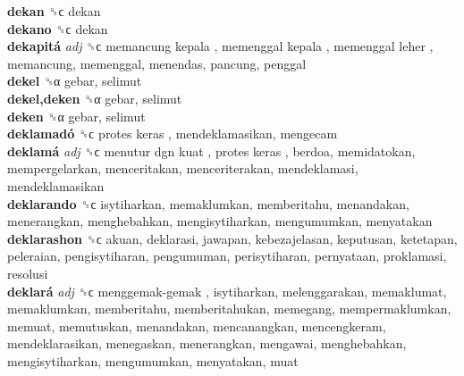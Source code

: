 \textbf{dekan} ␝ϲ  dekan  \\
\textbf{dekano} ␝ϲ  dekan  \\
\textbf{dekapitá} \emph{adj}  ␝ϲ   memancung kepala ,  memenggal kepala ,  memenggal leher , memancung, memenggal, menendas, pancung, penggal  \\
\textbf{dekel} ␝α  gebar, selimut  \\
\textbf{dekel,deken} ␝α  gebar, selimut  \\
\textbf{deken} ␝α  gebar, selimut  \\
\textbf{deklamadó} ␝ϲ   protes keras , mendeklamasikan, mengecam  \\
\textbf{deklamá} \emph{adj}  ␝ϲ   menutur dgn kuat ,  protes keras , berdoa, memidatokan, mempergelarkan, menceritakan, menceriterakan, mendeklamasi, mendeklamasikan  \\
\textbf{deklarando} ␝ϲ  isytiharkan, memaklumkan, memberitahu, menandakan, menerangkan, menghebahkan, mengisytiharkan, mengumumkan, menyatakan  \\
\textbf{deklarashon} ␝ϲ  akuan, deklarasi, jawapan, kebezajelasan, keputusan, ketetapan, peleraian, pengisytiharan, pengumuman, perisytiharan, pernyataan, proklamasi, resolusi  \\
\textbf{deklará} \emph{adj}  ␝ϲ   menggemak-gemak , isytiharkan, melenggarakan, memaklumat, memaklumkan, memberitahu, memberitahukan, memegang, mempermaklumkan, memuat, memutuskan, menandakan, mencanangkan, mencengkeram, mendeklarasikan, menegaskan, menerangkan, mengawai, menghebahkan, mengisytiharkan, mengumumkan, menyatakan, muat  \\

